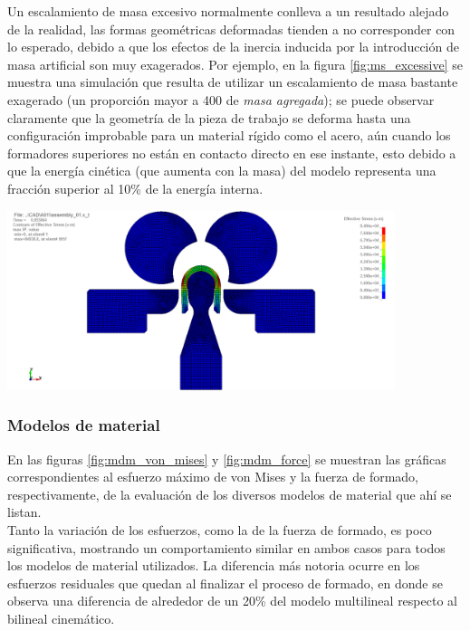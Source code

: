 Un escalamiento de masa excesivo normalmente conlleva a un resultado alejado de la realidad, las formas 
geométricas deformadas tienden a no corresponder con lo esperado, debido a que los efectos de la inercia 
inducida por la introducción de masa artificial son muy exagerados. Por ejemplo, en la figura 
\ref{fig:ms_excessive} se muestra una simulación que resulta de utilizar un escalamiento de masa bastante 
exagerado (un proporción mayor a 400 de \textit{masa agregada}); se puede observar claramente que la geometría 
de la pieza de trabajo se deforma hasta una configuración improbable para un material rígido como el acero, 
aún cuando los formadores superiores no están en contacto directo en ese instante, esto debido a que la 
energía cinética (que aumenta con la masa) del modelo representa una fracción superior al 10\% de la 
energía interna.\\

\begin{center}
\includegraphics[width=0.85\textwidth]{src/ch4/ms_excessive.png}
\label{fig:ms_excessive}
\end{center}

\subsubsection{Modelos de material}

En las figuras  \ref{fig:mdm_von_mises} y \ref{fig:mdm_force} se muestran las gráficas correspondientes 
al esfuerzo máximo de von Mises y la fuerza de formado, respectivamente, de la evaluación de los diversos 
modelos de material que ahí se listan.\\

Tanto la variación de los esfuerzos, como la de la fuerza de formado, es poco significativa, mostrando 
un comportamiento similar en ambos casos para todos los modelos de material utilizados. La 
diferencia más notoria ocurre en los esfuerzos residuales que quedan al finalizar el proceso 
de formado, en donde se observa una diferencia de alrededor de un 20\% del modelo multilineal 
respecto al bilineal cinemático.

